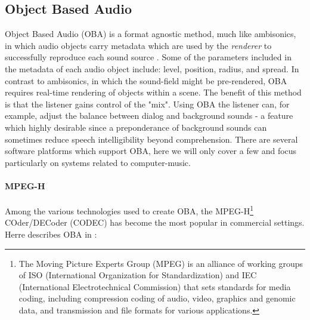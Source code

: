 

\subsection{Object Based Audio}
\label{subsec:oba}

Object Based Audio (OBA) is a format agnostic method, much like ambisonics, in which audio objects carry metadata which are used by the \textit{renderer} to successfully reproduce each sound source \cite{coleman2018audio}. Some of the parameters included in the metadata of each audio object include: level, position, radius, and spread\cite{fug2014design}. In contrast to ambisonics, in which the sound-field might be pre-rendered, OBA requires real-time rendering of objects within a scene. The benefit of this method is that the listener gains control of the "mix". Using OBA the listener can, for example, adjust the balance between dialog and background sounds - a feature which highly desirable since a preponderance of background sounds can sometimes reduce speech intelligibility beyond comprehension. There are several software platforms which support OBA, here we will only cover a few and focus particularly on systems related to computer-music.

\paragraph{MPEG-H}

Among the various technologies used to create OBA, the MPEG-H\footnote{The Moving Picture Experts Group (MPEG) is an alliance of working groups of ISO (International Organization for Standardization) and IEC (International Electrotechnical Commission) that sets standards for media coding, including compression coding of audio, video, graphics and genomic data, and transmission and file formats for various applications.} COder/DECoder (CODEC) has become the most popular in commercial settings. Herre describes OBA in \cite{herre2015mpeg}:

